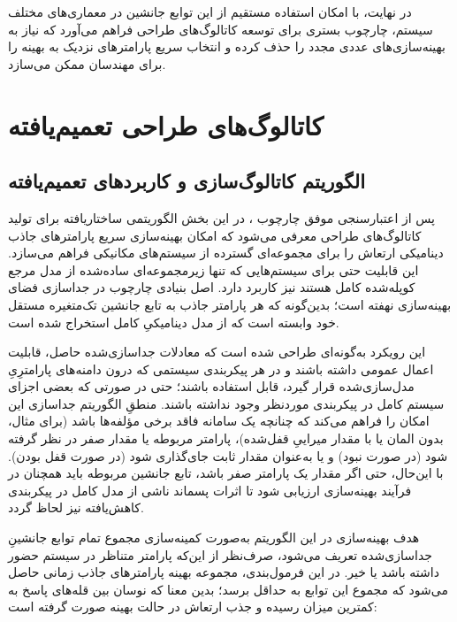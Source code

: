 در نهایت، با امکان استفاده مستقیم از این توابع جانشین در معماری‌های مختلف سیستم، چارچوب  بستری برای توسعه کاتالوگ‌های طراحی فراهم می‌آورد که نیاز به بهینه‌سازی‌های عددی مجدد را حذف کرده و انتخاب سریع پارامترهای نزدیک به بهینه را برای مهندسان ممکن می‌سازد.


\section{کاتالوگ‌های طراحی تعمیم‌یافته}

\subsection{الگوریتم کاتالوگ‌سازی و کاربردهای تعمیم‌یافته}

پس از اعتبارسنجی موفق چارچوب ، در این بخش الگوریتمی ساختاریافته برای تولید کاتالوگ‌های طراحی معرفی می‌شود که امکان بهینه‌سازی سریع پارامترهای جاذب دینامیکی ارتعاش را برای مجموعه‌ای گسترده از سیستم‌های مکانیکی فراهم می‌سازد. این قابلیت حتی برای سیستم‌هایی که تنها زیرمجموعه‌ای ساده‌شده از مدل مرجع کوپله‌شده کامل هستند نیز کاربرد دارد. اصل بنیادی چارچوب  در جداسازی فضای بهینه‌سازی نهفته است؛ بدین‌گونه که هر پارامتر جاذب به تابع جانشین تک‌متغیره مستقل خود وابسته است که از مدل دینامیکیِ کامل استخراج شده است.

این رویکرد به‌گونه‌ای طراحی شده است که معادلات جداسازی‌شده حاصل، قابلیت اعمال عمومی داشته باشند و در هر پیکربندی سیستمی که درون دامنه‌های پارامترِیِ مدل‌سازی‌شده قرار گیرد، قابل استفاده باشند؛ حتی در صورتی که بعضی اجزای سیستم کامل در پیکربندی موردنظر وجود نداشته باشند. منطقِ الگوریتم جداسازی این امکان را فراهم می‌کند که چنانچه یک سامانه فاقد برخی مؤلفه‌ها باشد (برای مثال، بدون المان  یا با مقدار میراییِ قفل‌شده)، پارامتر مربوطه یا مقدار صفر در نظر گرفته شود (در صورت نبود) و یا به‌عنوان مقدار ثابت جای‌گذاری شود (در صورت قفل بودن). با این‌حال، حتی اگر مقدار یک پارامتر صفر باشد، تابع جانشین مربوطه باید همچنان در فرآیند بهینه‌سازی ارزیابی شود تا اثرات پسماند ناشی از مدل کامل در پیکربندی کاهش‌یافته نیز لحاظ گردد.

هدف بهینه‌سازی در این الگوریتم به‌صورت کمینه‌سازی مجموع تمام توابع جانشینِ جداسازی‌شده تعریف می‌شود، صرف‌نظر از این‌که پارامتر متناظر در سیستم حضور داشته باشد یا خیر. در این فرمول‌بندی، مجموعه بهینه پارامترهای جاذب زمانی حاصل می‌شود که مجموع این توابع به حداقل برسد؛ بدین معنا که نوسان بین قله‌های پاسخ به کمترین میزان رسیده و جذب ارتعاش در حالت بهینه صورت گرفته است:

